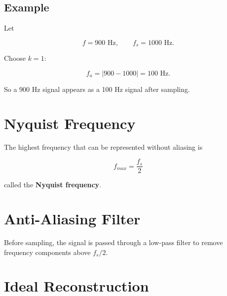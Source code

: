 \subsection{Example}

Let

\[
f=900\text{ Hz},
\qquad
f_s=1000\text{ Hz}.
\]

Choose \(k=1\):

\[
f_a=|900-1000|=100\text{ Hz}.
\]

So a 900 Hz signal appears as a 100 Hz signal after sampling.


\section{Nyquist Frequency}

The highest frequency that can be represented without aliasing is

\[
\boxed{
f_{max}=\frac{f_s}{2}
}
\]

called the \textbf{Nyquist frequency}.


\section{Anti-Aliasing Filter}

Before sampling, the signal is passed through a low-pass filter to remove frequency
components above \(f_s/2\).

\begin{center}
\end{center}


\section{Ideal Reconstruction}

